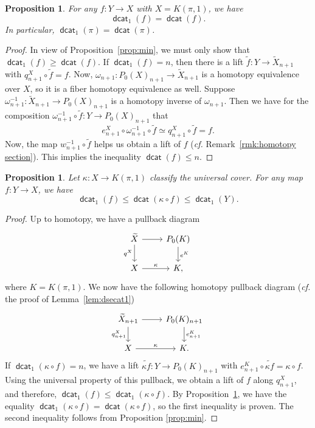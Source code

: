 \documentclass[amscd,amssymb,verbatim,11pt]{amsart}
\theoremstyle{plain}
\newtheorem{proposition}[thm]{Proposition}
\theoremstyle{definition}
\DeclareMathOperator{\dcat}{{\mathsf{dcat}}}
\begin{document}
\begin{proposition}\label{prop:XKpi1}
For any $f\colon Y \to X$ with $X=K(\pi,1)$, we have
$$\dcat_1(f) = \dcat(f).$$
In particular, $\dcat_1(\pi)=\dcat(\pi)$.
\end{proposition}
\begin{proof}
In view of Proposition~\ref{prop:min}, we must only show that $\dcat_1(f) \geq \dcat(f)$. If $\dcat_1(f) = n$, then there is a lift $\widetilde f\colon
Y \to \widetilde X_{n+1}$ with $q_{n+1}^X\circ \widetilde f = f$. Now, $\omega_{n+1}\colon P_0(X)_{n+1}
\to \widetilde X_{n+1}$ is a homotopy equivalence over $X$, so it is a fiber homotopy equivalence as well. Suppose $\omega_{n+1}^{-1}:\widetilde X_{n+1}\to P_0(X)_{n+1}$ is a homotopy inverse of $\omega_{n+1}$. Then we have for the composition $\omega_{n+1}^{-1} \circ \widetilde f \colon Y \to P_0(X)_{n+1}$ that
\[
e_{n+1}^X \circ \omega_{n+1}^{-1} \circ \widetilde f \simeq q_{n+1}^X\circ\widetilde f = f.
\]
Now, the map $w_{n+1}^{-1} \circ \widetilde{f}$ helps us obtain a lift of $f$ (\emph{cf.} Remark~\ref{rmk:homotopy section}). This implies the inequality $\dcat(f) \leq n$.
\end{proof}

\begin{proposition}\label{prop:classmap}
Let $\kappa\colon X \to K(\pi,1)$ classify the universal cover. For any map $f\colon Y \to X$, we have
$$\dcat_1(f) \leq \dcat(\kappa\circ f) \leq \dcat_1(Y).$$
\end{proposition}
\begin{proof}
Up to homotopy, we have a pullback diagram
\[
\begin{tikzcd}[contains/.style = {draw=none,"\in" description,sloped}]
\widetilde X \arrow{r}{} \arrow[swap]{d}{q^X}
&
P_0(K) \arrow{d}{e^K}
\\
X  \arrow{r}{\kappa}
&
K,
\end{tikzcd}
\]
where $K = K(\pi,1)$. We now have the following homotopy pullback diagram (\emph{cf.} the proof of Lemma~\ref{lem:dsecat1})
\[
\begin{tikzcd}[contains/.style = {draw=none,"\in" description,sloped}]
\widetilde X_{n+1} \arrow{r}{} \arrow[swap]{d}{q_{n+1}^X}
&
P_0(K)_{n+1} \arrow{d}{e_{n+1}^K}
\\
X  \arrow{r}{\kappa}
&
K.
\end{tikzcd}
\]
If $\dcat_1(\kappa\circ f)=n$, we have a lift $\widetilde{\kappa f}\colon Y\to P_0(K)_{n+1}$ with $e_{n+1}^K\circ \widetilde{\kappa f}=\kappa\circ f$. Using the universal property of this pullback, we obtain a lift of $f$ along $q_{n+1}^X$, and therefore,
$\dcat_1(f) \leq \dcat_1(\kappa\circ f)$. By Proposition~\ref{prop:XKpi1}, we have the equality $\dcat_1(\kappa\circ f)
= \dcat(\kappa\circ f)$, so the first inequality is proven. The second inequality follows from Proposition
\ref{prop:min}.
\end{proof}
\end{document}
